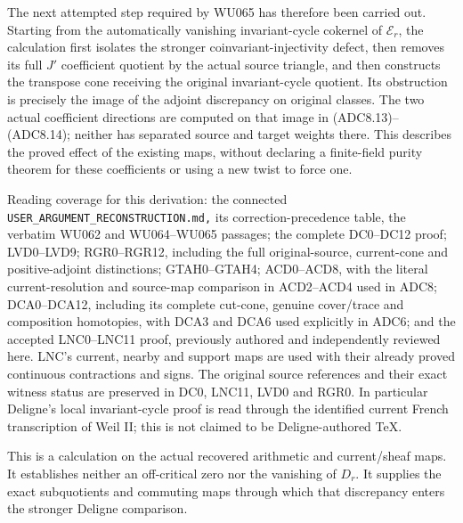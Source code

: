 The next attempted step required by WU065 has therefore been carried
out. Starting from the automatically vanishing invariant-cycle cokernel
of \(\mathscr E_r\), the calculation first isolates the stronger
coinvariant-injectivity defect, then removes its full \(J'\) coefficient
quotient by the actual source triangle, and then constructs the
transpose cone receiving the original invariant-cycle quotient. Its
obstruction is precisely the image of the adjoint discrepancy on
original classes. The two actual coefficient directions are computed on
that image in (ADC8.13)--(ADC8.14); neither has separated source and
target weights there. This describes the proved effect of the existing
maps, without declaring a finite-field purity theorem for these
coefficients or using a new twist to force one.

Reading coverage for this derivation: the connected
\nolinkurl{USER_ARGUMENT_RECONSTRUCTION.md,} its correction-precedence
table, the verbatim WU062 and WU064--WU065 passages; the complete
DC0--DC12 proof; LVD0--LVD9; RGR0--RGR12, including the full
original-source, current-cone and positive-adjoint distinctions;
GTAH0--GTAH4; ACD0--ACD8, with the literal current-resolution and
source-map comparison in ACD2--ACD4 used in ADC8; DCA0--DCA12, including
its complete cut-cone, genuine cover/trace and composition homotopies,
with DCA3 and DCA6 used explicitly in ADC6; and the accepted LNC0--LNC11
proof, previously authored and independently reviewed here. LNC's
current, nearby and support maps are used with their already proved
continuous contractions and signs. The original source references and
their exact witness status are preserved in DC0, LNC11, LVD0 and RGR0.
In particular Deligne's local invariant-cycle proof is read through the
identified current French transcription of Weil II; this is not claimed
to be Deligne-authored TeX.

This is a calculation on the actual recovered arithmetic and
current/sheaf maps. It establishes neither an off-critical zero nor the
vanishing of \(D_r\). It supplies the exact subquotients and commuting
maps through which that discrepancy enters the stronger Deligne
comparison.
